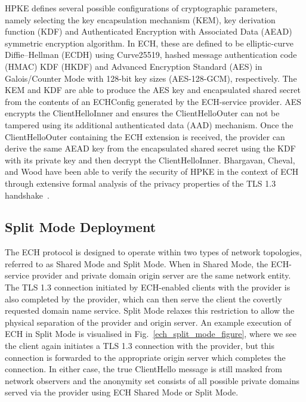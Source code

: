 HPKE defines several possible configurations of cryptographic parameters, namely selecting the key encapsulation mechanism (KEM), key derivation function (KDF) and Authenticated Encryption with Associated Data (AEAD) symmetric encryption algorithm. In ECH, these are defined to be elliptic-curve Diffie–Hellman (ECDH) using Curve25519, hashed message authentication code (HMAC) KDF (HKDF) and Advanced Encryption Standard (AES) in Galois/Counter Mode with 128-bit key sizes (AES-128-GCM), respectively. The KEM and KDF are able to produce the AES key and encapsulated shared secret from the contents of an ECHConfig generated by the ECH-service provider. AES encrypts the ClientHelloInner and ensures the ClientHelloOuter can not be tampered using its additional authenticated data (AAD) mechanism. Once the ClientHelloOuter containing the ECH extension is received, the provider can derive the same AEAD key from the encapsulated shared secret using the KDF with its private key and then decrypt the ClientHelloInner. Bhargavan, Cheval, and Wood have been able to verify the security of HPKE in the context of ECH through extensive formal analysis of the privacy properties of the TLS 1.3 handshake~\cite{bhargavan2022symbolic}.

\subsection{Split Mode Deployment}\label{split-mode-deployment}

The ECH protocol is designed to operate within two types of network topologies, referred to as Shared Mode and Split Mode. When in Shared Mode, the ECH-service provider and private domain origin server are the same network entity. The TLS 1.3 connection initiated by ECH-enabled clients with the provider is also completed by the provider, which can then serve the client the covertly requested domain name service. Split Mode relaxes this restriction to allow the physical separation of the provider and origin server. An example execution of ECH in Split Mode is visualised in Fig.~\ref{ech_split_mode_figure}, where we see the client again initiates a TLS 1.3 connection with the provider, but this connection is forwarded to the appropriate origin server which completes the connection. In either case, the true ClientHello message is still masked from network observers and the anonymity set consists of all possible private domains served via the provider using ECH Shared Mode or Split Mode.


